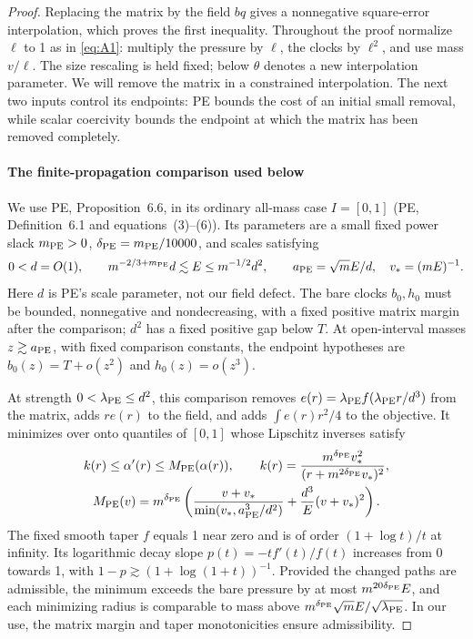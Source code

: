 \begin{proof}
Replacing the matrix by the field \(bq\) gives a nonnegative
square-error interpolation, which proves the first inequality.
Throughout the proof normalize \(\ell\) to 1 as in \eqref{eq:A1}:
multiply the pressure by \(\ell\), the clocks by \(\ell^2\), and use
mass \(v/\ell\). The size rescaling is held fixed; below \(\theta\)
denotes a new interpolation parameter. We will remove the matrix in a
constrained interpolation. The next two inputs control its endpoints:
PE bounds the cost of an initial small removal, while scalar coercivity
bounds the endpoint at which the matrix has been removed completely.

\paragraph{The finite-propagation comparison used below}
We use PE, Proposition~6.6, in its ordinary all-mass case
\(I=[0,1]\) (PE, Definition~6.1 and equations~(3)--(6)). Its
parameters are a small fixed power slack \(m_{\rm PE}>0\),
\(\delta_{\rm PE}=m_{\rm PE}/10000\), and scales satisfying
\[
 0<d=O(1),\qquad
 m^{-2/3+m_{\rm PE}}d\lesssim E\le m^{-1/2}d^2,
 \qquad a_{\rm PE}=\sqrt m E/d,\quad v_*=(mE)^{-1}.
\]
Here \(d\) is PE's scale parameter, not our field defect. The bare
clocks \(b_0,h_0\) must be bounded, nonnegative and nondecreasing,
with a fixed positive matrix margin after the comparison; \(d^2\)
has a fixed positive gap below \(T\). At open-interval masses
\(z\gtrsim a_{\rm PE}\), with fixed comparison constants, the
endpoint hypotheses are
\(b_0(z)=T+o(z^2)\) and \(h_0(z)=o(z^3)\).

At strength \(0<\lambda_{\rm PE}\le d^2\), this comparison removes
\(e(r)=\lambda_{\rm PE}f(\lambda_{\rm PE}r/d^3)\) from the matrix,
adds \(re(r)\) to the field, and adds \(\int e(r)r^2/4\) to the
objective. It minimizes over onto quantiles of \([0,1]\) whose
Lipschitz inverses satisfy
\[
\begin{gathered}
 k(r)\le\alpha'(r)\le M_{\rm PE}(\alpha(r)),\qquad
 k(r)=\frac{m^{\delta_{\rm PE}}v_*^2}{(r+m^{2\delta_{\rm PE}}v_*)^2},\\
 M_{\rm PE}(v)=m^{\delta_{\rm PE}}\left(
 \frac{v+v_*}{\min(v_*,a_{\rm PE}^3/d^2)}
 +\frac{d^3}{E}(v+v_*)^2\right).
\end{gathered}
\]
The fixed smooth taper \(f\) equals 1 near zero and is of order
\((1+\log t)/t\) at infinity. Its logarithmic decay slope
\(p(t)=-tf'(t)/f(t)\) increases from 0 towards 1, with
\(1-p\gtrsim(1+\log(1+t))^{-1}\). Provided the changed paths
are admissible, the minimum exceeds the bare pressure by at most
\(m^{20\delta_{\rm PE}}E\), and each minimizing radius is comparable
to mass above \(m^{\delta_{\rm PE}}\sqrt m E/\sqrt{\lambda_{\rm PE}}\).
In our use, the matrix margin and taper monotonicities ensure admissibility.


\end{proof}

